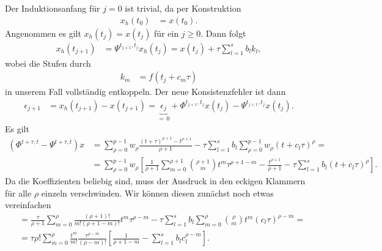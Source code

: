 \documentclass[english, parskip=full]{scrartcl}
\newcommand{\kla}{}
\newcommand{\klam}{}
\begin{document}
Der Induktionsanfang für $j=0$ ist trivial, da per Konstruktion
\begin{align}
x_h(t_0) &= x(t_0).
\end{align}
Angenommen es gilt $x_h(t_{j}) = x(t_{j})$ für ein $j\ge 0$.
Dann folgt
\begin{align}
x_h(t_{j+1}) &= \Psi^{t_{j+1},t_{j}}x_h(t_{j}) = x(t_{j}) + \tau \sum_{l=1}^s b_lk_l,
\end{align}
wobei die Stufen durch
\begin{align}
k_m &= f\kla\left( t_j + c_m\tau \right)
\end{align}
in unserem Fall vollständig entkoppeln.
Der neue Konsistenzfehler ist dann
\begin{align}
\epsilon_{j+1} &= x_h(t_{j+1}) - x(t_{j+1}) = \underbrace{\epsilon_{j}}_{=\,0} + \Phi^{t_{j+1},t_j} x(t_j) - \Psi^{t_{j+1},t_j} x(t_j).
\end{align}
Es gilt
\begin{align}
\kla\left( \Phi^{t+\tau, t} - \Psi^{t+\tau, t} \right)x &= \sum_{\rho=0}^{p-1} w_\rho \frac{(t+\tau)^{\rho + 1} - t^{\rho + 1}}{\rho + 1} - \tau \sum_{l=1}^s b_l \sum_{\rho = 0}^{p-1} w_\rho \kla\left( t + c_l \tau \right)^\rho = \\
&= \sum_{\rho = 0}^{p-1} w_\rho \klam\left[ \frac{1}{\rho + 1} \sum_{m=0}^{\rho + 1} \binom{\rho+1}{m} t^m \tau^{\rho+1-m} - \frac{t^{\rho + 1}}{\rho + 1} - \tau \sum_{l=1}^s b_l (t + c_l\tau)^\rho \right].
\end{align}
Da die Koeffizienten beliebig sind, muss der Ausdruck in den eckigen Klammern für alle $\rho$ einzeln verschwinden.
Wir können diesen zunächst noch etwas vereinfachen
\begin{align}
[\dots] &= \frac{\tau}{\rho+1} \sum_{m=0}^\rho \frac{(\rho + 1)!}{m!(\rho + 1 - m)!} t^m \tau^{\rho - m} - \tau \sum_{l = 1}^s b_l \sum_{m=0}^\rho \binom{\rho}{m} t^m (c_l\tau)^{\rho - m}  = \\
&= \tau \rho! \sum_{m=0}^\rho \frac{t^m}{m!} \frac{\tau^{\rho - m}}{(\rho - m)!} \klam\left[ \frac{1}{\rho + 1 - m} - \sum_{l=1}^s b_l c_l^{\rho - m} \right].
\end{align}
\end{document}
